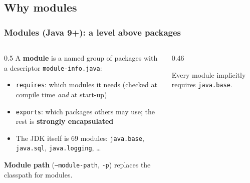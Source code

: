 \documentclass[aspectratio=169,10pt,compress]{beamer}
\begin{document}

\subsection[Idea]{Why modules}




\begin{frame}[t,fragile] \frametitle{Modules (Java 9+): a level above packages}
  \begin{columns}[T]
    \begin{column}{0.5\textwidth}
      \small A \textbf{module} is a named group of packages with a descriptor \texttt{module-info.java}:
      \begin{itemize}\small
        \item \texttt{requires}: which modules it needs (checked at compile time \emph{and} at start-up)
        \item \texttt{exports}: which packages others may use; the rest is \textbf{strongly encapsulated}
        \item The JDK itself is 69 modules: \texttt{java.base}, \texttt{java.sql}, \texttt{java.logging}, \dots
      \end{itemize}
      \small \textbf{Module path} (\texttt{--module-path}, \texttt{-p}) replaces the classpath for modules.
    \end{column}
    \begin{column}{0.46\textwidth}
      \begin{center}
      \end{center}
      \small Every module implicitly requires \texttt{java.base}.
    \end{column}
  \end{columns}
\end{frame}
\end{document}
